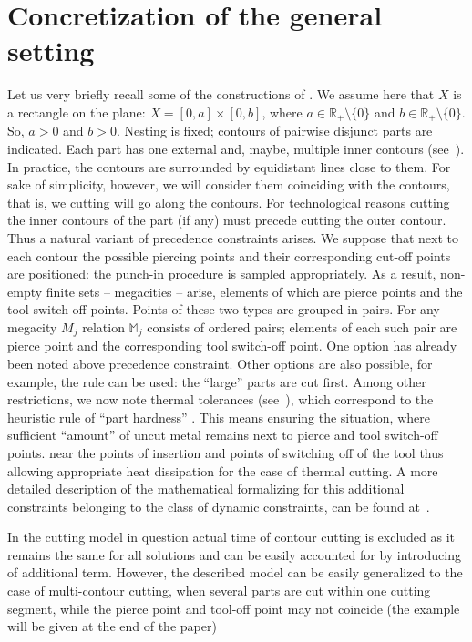\documentclass[10pt]{article}
\begin{document}
\section{Concretization of the general setting}
\label{sec:3}

Let us very briefly recall some of the constructions of
\cite [$\S$ 3.3]{4}.
We assume here that $ X $ is a rectangle on the plane:
$X = [0,a] \times [0,b]$,
where
$a \in \mathbb{R}_+ \setminus \{0\}$
and $b \in \mathbb{R}_+ \setminus \{0\}.$
So, $a > 0$ and
$b > 0$.
Nesting is fixed;
contours of pairwise disjunct parts are indicated.
Each part has one external and,
maybe,
multiple inner contours
(see~\cite[\S~3.2]{4}).
In practice,
the contours are surrounded by equidistant lines close to them.
For sake of simplicity,
however,
we will consider them coinciding with the contours,
that is, we cutting will go along the contours.
For technological reasons
cutting the inner contours of the part
(if any)
must precede cutting the outer contour.
Thus a natural variant of precedence constraints arises.
We suppose
that next to each contour the possible
piercing points and their corresponding cut-off points
are positioned:
the punch-in procedure is sampled appropriately.
As a result, non-empty finite sets
-- megacities --
arise,
elements of which are pierce points
and the tool switch-off points.
Points of these two types are grouped in pairs.
For any megacity
$M_j$
relation
$\mathbb{M}_j$
consists of ordered pairs;
elements of each such pair are
pierce point
and the corresponding tool switch-off point.
One option has already been noted above
precedence constraint.
Other options are also possible,
for example,
the rule can be used:
the ``large'' parts are cut first.
Among other restrictions, we now note
thermal tolerances
(see~\cite{18}),
which correspond to the heuristic rule of ``part hardness''
\cite{4}.
This means ensuring the situation,
where
sufficient ``amount''
of uncut metal
remains next to pierce and tool switch-off points.
near the points of insertion and points of switching off of the tool
thus allowing appropriate
heat dissipation
for the case of thermal cutting.
A more detailed description of the mathematical
formalizing
for this additional
constraints
belonging to the class of dynamic constraints,
can be found at~\cite{18}.

In the cutting model in question
actual time of contour cutting
is excluded
as it remains the same for all solutions
and can be easily accounted for by introducing of
additional term.
However,
the described model can be easily generalized to
the case of  multi-contour cutting,
when
several parts are cut within one cutting segment,
while the pierce point
and tool-off point
may not coincide
(the example will be given at the end
of the paper)
\end{document}
